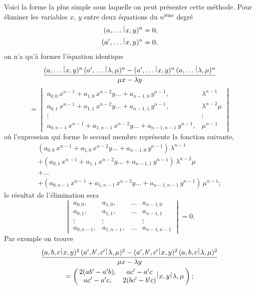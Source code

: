 \documentclass[11pt,a4paper]{book}
\theoremstyle{plain}
\newcommand{\wrule}{\hspace{-0.1em}\mid\hspace{-0.1em}}
\begin{document}
Voici la forme la plus simple sous laquelle on peut pr\'{e}senter cette m\'{e}thode. Pour \'{e}liminer les variables $x$, $y$ entre deux \'{e}quations du $n^{\text{i\`{e}me}}$ degr\'{e}
\begin{align*}
(a,\ldots\,\raisebox{0.5ex}{$\wrule$}\,x,y)^n&=0,\\
(a',\ldots\,\raisebox{0.5ex}{$\wrule$}\,x,y)^n&=0,
\end{align*}
on n'a qu'\`{a} former l'\'{e}quation identique
\[
\frac{(a,\ldots\,\raisebox{0.5ex}{$\wrule$}\,x,y)^n\,(a',\ldots\,\raisebox{0.5ex}{$\wrule$}\,\lambda,\mu)^n-(a',\ldots\,\raisebox{0.5ex}{$\wrule$}\,x,y)^n\,(a,\ldots\,\raisebox{0.5ex}{$\wrule$}\,\lambda,\mu)^n}{\mu x-\lambda y}
\]
\[
=\begin{vmatrix}
a_{0,0}\,x^{n-1}+a_{1,0}\,x^{n-2}y\ldots+a_{n-1,0}\,y^{n-1}, & \lambda^{n-1}\\
a_{0,1}\,x^{n-1}+a_{1,1}\,x^{n-2}y\ldots+a_{n-1,1}\,y^{n-1}, & \lambda^{n-2}\mu\\
\vdots & \vdots\\
a_{0,n-1}\,x^{n-1}+a_{1,n-1}\,x^{n-2}y\ldots+a_{n-1,n-1}\,y^{n-1}, & \mu^{n-1}
\end{vmatrix}
\]
o\`{u} l'expression qui forme le second membre repr\'{e}sente la fonction suivante,
\begin{multline*}
(a_{0,0}\,x^{n-1}+a_{1,0}\,x^{n-2}y\ldots+a_{n-1,0}\,y^{n-1})\,\lambda^{n-1}\\
+(a_{0,1}\,x^{n-1}+a_{1,1}\,x^{n-2}y\ldots+a_{n-1,1}\,y^{n-1})\,\lambda^{n-2}\mu\\
+\ldots\\
+(a_{0,n-1}\,x^{n-1}+a_{1,n-1}\,x^{n-2}y\ldots+a_{n-1,n-1}\,y^{n-1})\,\mu^{n-1};
\end{multline*}
le r\'{e}sultat de l'\'{e}limination sera
\[
\begin{vmatrix}
a_{0,0}, & a_{1,0}, & \ldots & a_{n-1,0}\\
a_{0,1}, & a_{1,1}, & \ldots & a_{n-1,1}\\
\vdots & \vdots & & \vdots\\
a_{0,n-1}, & a_{1,n-1}, & \ldots & a_{n-1,n-1}
\end{vmatrix}
=0.
\]
Par exemple on trouve
\begin{multline*}
\frac{(a,b,c\,\raisebox{0.5ex}{$\wrule$}\,x,y)^2\,(a',b',c'\,\raisebox{0.5ex}{$\wrule$}\,\lambda,\mu)^2-(a',b',c'\,\raisebox{0.5ex}{$\wrule$}\,x,y)^2\,(a,b,c\,\raisebox{0.5ex}{$\wrule$}\,\lambda,\mu)^2}{\mu x-\lambda y}\\
=\left(\,\begin{matrix} 2(ab'-a'b), & ac'-a'c\\ ac'-a'c, & 2(bc'-b'c)\end{matrix}\,\raisebox{0.5ex}{$\wrule$}\,x,y\,\raisebox{0.5ex}{$\wrule$}\,\lambda,\mu\,\right);
\end{multline*}
\end{document}

